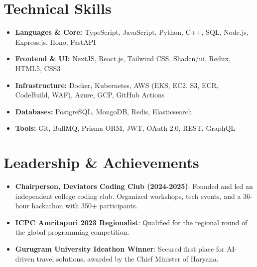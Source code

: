\documentclass[letterpaper,11pt]{article}
\begin{document}
\section{Technical Skills}
\begin{itemize}[leftmargin=*,itemsep=0pt,parsep=0pt,topsep=0pt,partopsep=0pt]
	\item \textbf{Languages \& Core:} TypeScript, JavaScript, Python, C++, SQL, Node.js, Express.js, Hono, FastAPI
	\item \textbf{Frontend \& UI:} NextJS, React.js, Tailwind CSS, Shadcn/ui, Redux, HTML5, CSS3
	\item \textbf{Infrastructure:} Docker, Kubernetes, AWS (EKS, EC2, S3, ECR, CodeBuild, WAF), Azure, GCP, GitHub Actions
	\item \textbf{Databases:} PostgreSQL, MongoDB, Redis, Elasticsearch
	\item \textbf{Tools:} Git, BullMQ, Prisma ORM, JWT, OAuth 2.0, REST, GraphQL
\end{itemize}
\vspace{-6pt}

\section{Leadership \& Achievements}
\begin{itemize}[leftmargin=*,itemsep=0pt,parsep=0pt,topsep=0pt,partopsep=0pt]
	\item \textbf{Chairperson, Deviators Coding Club (2024-2025)}: Founded and led an independent college coding club. Organized workshops, tech events, and a 36-hour hackathon with 350+ participants.
	\item \textbf{ICPC Amritapuri 2023 Regionalist}: Qualified for the regional round of the global programming competition.
	\item \textbf{Gurugram University Ideathon Winner}: Secured first place for AI-driven travel solutions, awarded by the Chief Minister of Haryana.
\end{itemize}
\end{document}
